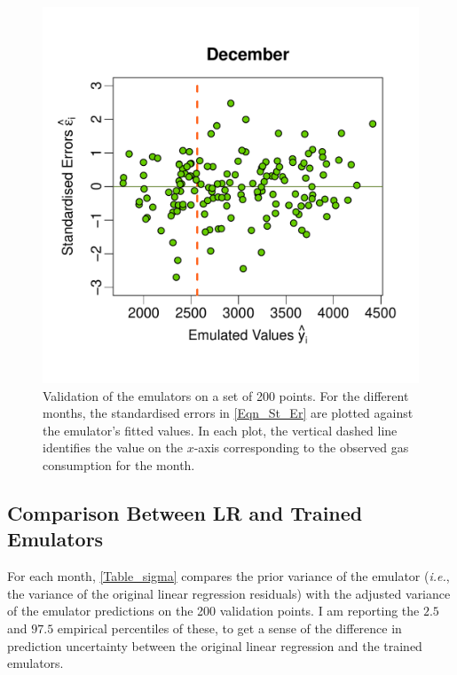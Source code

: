 \documentclass[a4paper, 12pt]{article}
\newcommand{\ie}{\textit{i.e.}}
\begin{document}
\begin{figure}
 \includegraphics[width=\scale]{Validation_Plots/Validation_Scatter_12_Dec}
 \caption{Validation of the emulators on a set of 200 points. For the different months, the standardised errors in \eqref{Eqn_St_Er} are plotted against the emulator's fitted values. In each plot, the vertical dashed line identifies the value on the $x$-axis corresponding to the observed gas consumption for the month.}
 \label{Fig_Scatter_Errors}
\end{figure}


\subsection{Comparison Between LR and Trained Emulators}

For each month, \autoref{Table_sigma} compares the prior variance of the emulator (\ie, the variance of the original linear regression residuals) with the adjusted variance of the emulator predictions on the 200 validation points. I am reporting the $2.5$ and $97.5$ empirical percentiles of these, to get a sense of the difference in prediction uncertainty between the original linear regression and the trained emulators.
\end{document}
